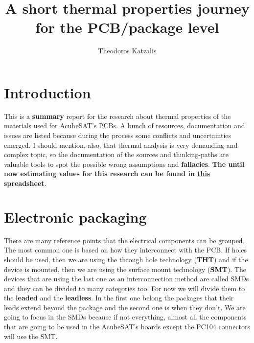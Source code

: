 \documentclass[final]{cubedoc}
\title{A short thermal properties journey for the PCB/package level} %
\author{Theodoros Katzalis}
\begin{document}
	
	\section{Introduction}
	
	This is a \textbf{summary} report for the research about thermal properties of the materials used for AcubeSAT's PCBs. A bunch of resources, documentation and issues are listed because during the process some conflicts and uncertainties emerged. I should mention, also, that thermal analysis is very demanding and complex topic, so the documentation of the sources and thinking-paths are valuable tools to spot the possible wrong assumptions and \textbf{fallacies}. \textbf{The until now estimating values for this research can be found in \href{https://drive.google.com/open?id=1gGPhBZe94Yt7D8FDdGNza4ZnG0pRfhT0xG7Z2tBdK7o}{this} spreadsheet}.
	
	
	
	
	
	\section{Electronic packaging}
	
	There are many reference points that the electrical components can be grouped. The most common one is based on how they interconnect with the PCB. If holes should be used, then we are using the through hole technology (\textbf{THT}) and if the device is mounted, then we are using the surface mount technology (\textbf{SMT}). The devices that are using the last one as an interconnection method are called SMDs and they can be divided to many categories too. For now we will divide them to the \textbf{leaded} and the \textbf{leadless}. In the first one belong the packages that their leads extend beyond the package and the second one is when they don't. We are going to focus in the SMDs because if not everything, almost all the components that are going to be used in the AcubeSAT's boards except the PC104 connectors will use the SMT. 
	
\end{document}
